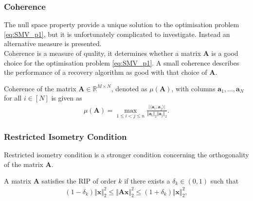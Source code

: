 \subsubsection{Coherence}
The null space property provide a unique solution to the optimisation problem \eqref{eq:SMV_p1}, but it is unfortunately complicated to investigate. 
Instead an alternative measure is presented.
\\
Coherence is a measure of quality, it determines whether a matrix $\mathbf{A}$ is a good choice for the optimisation problem \eqref{eq:SMV_p1}. 
A small coherence describes the performance of a recovery algorithm as good with that choice of $\mathbf{A}$. 
\begin{definition}[Coherence]
Coherence of the matrix $\mathbf{A} \in \mathbb{R}^{M \times N}$, denoted as $\mu (\mathbf{A})$, with columns $\mathbf{a}_1, \dots, \mathbf{a}_N$ for all $i \in [N]$ is given as
\begin{align*}
\mu (\mathbf{A}) = \max_{1 \leq i < j \leq n} \frac{\vert \langle \mathbf{a}_i, \mathbf{a}_j \rangle \vert}{\Vert \mathbf{a}_i \Vert_2 \Vert \mathbf{a}_j \Vert_2}.
\end{align*}
\end{definition}

\subsubsection{Restricted Isometry Condition}
Restricted isometry condition is a stronger condition concerning the orthogonality of the matrix $\mathbf{A}$.
\begin{definition}
A matrix $\mathbf{A}$ satisfies the RIP of order $k$ if there exists a $\delta_k \in (0,1)$ such that
\begin{align*}
(1 - \delta_k) \Vert \mathbf{x} \Vert_2^2 \leq \Vert \mathbf{Ax} \Vert_2^2 \leq (1 + \delta_k) \Vert \mathbf{x} \Vert_2^2,
\end{align*}
\end{definition}

